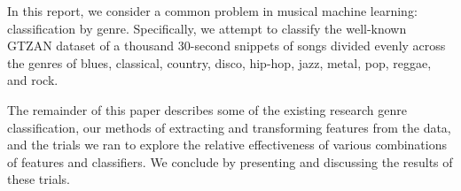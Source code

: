 In this report, we consider a common problem in musical machine learning: classification by genre. Specifically, we attempt to classify the well-known GTZAN dataset of a thousand 30-second snippets of songs divided evenly across the genres of blues, classical, country, disco, hip-hop, jazz, metal, pop, reggae, and rock.

The remainder of this paper describes some of the existing research genre classification, our methods of extracting and transforming features from the data, and the trials we ran to explore the relative effectiveness of various combinations of features and classifiers. We conclude by presenting and discussing the results of these trials.